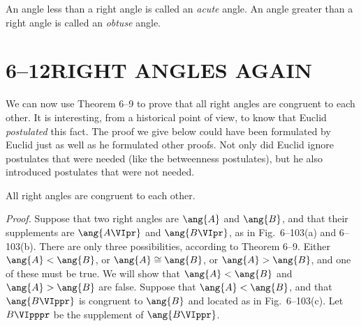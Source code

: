 \documentclass[11pt]{book}
\theoremstyle{bkplain}
\theoremstyle{XIplainnote}
\theoremstyle{bkplain}
\theoremstyle{bkplain}
\begin{document}
\begin{definition}
An angle less than a right angle is called an \emph{acute} angle. An angle
greater than a right angle is called an \emph{obtuse} angle.
\end{definition}

\section*{6--12\quad RIGHT ANGLES AGAIN}

We can now use Theorem 6--9 to prove that all right angles are congruent to
each other. It is interesting, from a historical point of view, to know that
Euclid \emph{postulated} this fact. The proof we give below could have been
formulated by Euclid just as well as he formulated other proofs. Not only did
Euclid ignore postulates that were needed (like the betweenness postulates),
but he also introduced postulates that were not needed.

\begin{theorem}
All right angles are congruent to each other.
\end{theorem}

\emph{Proof.} Suppose that two right angles are $\ang{A}$ and $\ang{B}$, and
that their supplements are $\ang{A\VIpr}$ and $\ang{B\VIpr}$, as in
Fig.~6--103(a) and 6--103(b). There are only three possibilities, according to
Theorem 6--9. Either $\ang{A} < \ang{B}$, or $\ang{A} \cong \ang{B}$, or
$\ang{A} > \ang{B}$, and one of these must be true. We will show that $\ang{A}
< \ang{B}$ and $\ang{A} > \ang{B}$ are false. Suppose that $\ang{A} < \ang{B}$,
and that $\ang{B\VIppr}$ is congruent to $\ang{B}$ and located as in
Fig.~6--103(c). Let $B\VIpppr$ be the supplement of $\ang{B\VIppr}$.

\FIGVIONEHUNDREDTHREE

\begin{steps}
\end{steps}
\end{document}
